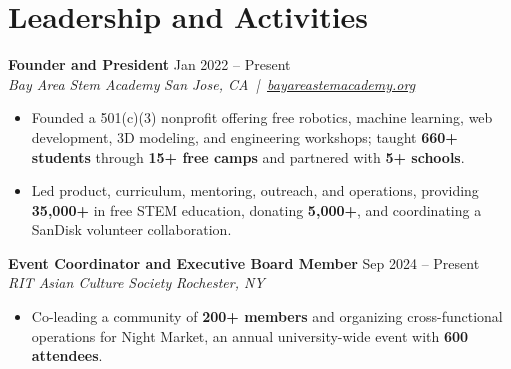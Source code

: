 \documentclass[10pt,letterpaper]{article}
\newif\ifresumeFirstRole
\newcommand{\resumeRole}[4]{%
  \ifresumeFirstRole
    \global\resumeFirstRolefalse
  \else
    \vspace{0pt plus 1fill}%
  \fi
  \textbf{#1} \hfill #2\\
  \textit{#3} \hfill \textit{#4}
}
\begin{document}
\section*{Leadership and Activities}
\resumeRole{Founder and President}{Jan 2022 -- Present}{Bay Area Stem Academy}{San Jose, CA \,|\, \href{https://bayareastemacademy.org}{bayareastemacademy.org}}
\begin{itemize}
  \item Founded a 501(c)(3) nonprofit offering free robotics, machine learning, web development, 3D modeling, and engineering workshops; taught \textbf{660+ students} through \textbf{15+ free camps} and partnered with \textbf{5+ schools}.
  \item Led product, curriculum, mentoring, outreach, and operations, providing \textbf{\textdollar{}35,000+} in free STEM education, donating \textbf{\textdollar{}5,000+}, and coordinating a SanDisk volunteer collaboration.
\end{itemize}

\resumeRole{Event Coordinator and Executive Board Member}{Sep 2024 -- Present}{RIT Asian Culture Society}{Rochester, NY}
\begin{itemize}
  \item Co-leading a community of \textbf{200+ members} and organizing cross-functional operations for Night Market, an annual university-wide event with \textbf{600 attendees}.
\end{itemize}
\end{document}
